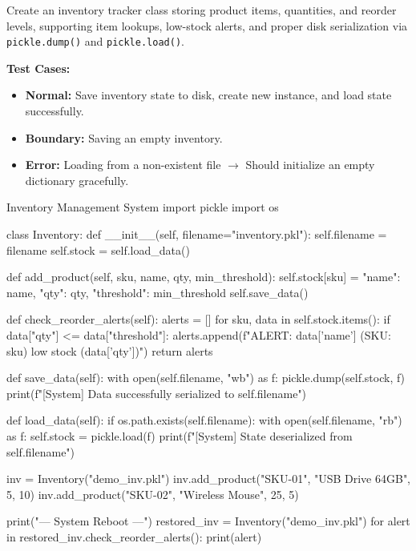 \begin{practiceset}
Create an inventory tracker class storing product items, quantities, and reorder levels, supporting item lookups, low-stock alerts, and proper disk serialization via \texttt{pickle.dump()} and \texttt{pickle.load()}.

\textbf{Test Cases:}
\begin{itemize}
    \item \textbf{Normal:} Save inventory state to disk, create new instance, and load state successfully.
    \item \textbf{Boundary:} Saving an empty inventory.
    \item \textbf{Error:} Loading from a non-existent file $\rightarrow$ Should initialize an empty dictionary gracefully.
\end{itemize}
\end{practiceset}

\begin{pythoncode}{Inventory Management System}
import pickle
import os

class Inventory:
    def __init__(self, filename="inventory.pkl"):
        self.filename = filename
        self.stock = {}
        self.load_data()
        
    def add_product(self, sku, name, qty, min_threshold):
        self.stock[sku] = {"name": name, "qty": qty, "threshold": min_threshold}
        self.save_data()
        
    def check_reorder_alerts(self):
        alerts = []
        for sku, data in self.stock.items():
            if data["qty"] <= data["threshold"]:
                alerts.append(f"ALERT: {data['name']} (SKU: {sku}) low stock ({data['qty']})")
        return alerts

    def save_data(self):
        with open(self.filename, "wb") as f:
            pickle.dump(self.stock, f)
            print(f"[System] Data successfully serialized to {self.filename}")

    def load_data(self):
        if os.path.exists(self.filename):
            with open(self.filename, "rb") as f:
                self.stock = pickle.load(f)
                print(f"[System] State deserialized from {self.filename}")

inv = Inventory("demo_inv.pkl")
inv.add_product("SKU-01", "USB Drive 64GB", 5, 10)
inv.add_product("SKU-02", "Wireless Mouse", 25, 5)

print("\n--- System Reboot ---")
restored_inv = Inventory("demo_inv.pkl")
for alert in restored_inv.check_reorder_alerts():
    print(alert)
\end{pythoncode}

